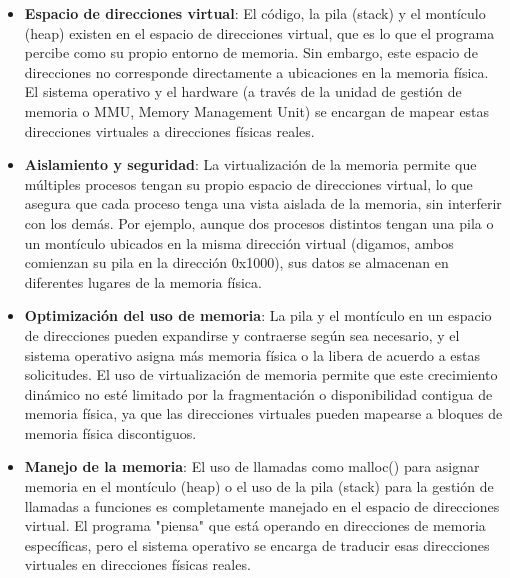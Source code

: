\documentclass{article}
\begin{document}
\begin{itemize}
    \item \textbf{Espacio de direcciones virtual}: El código, la pila (stack) y el montículo (heap) existen en el espacio de direcciones virtual, que es lo que el programa percibe como su propio entorno de memoria. Sin embargo, este espacio de direcciones no corresponde directamente a ubicaciones en la memoria física. El sistema operativo y el hardware (a través de la unidad de gestión de memoria o MMU, Memory Management Unit) se encargan de mapear estas direcciones virtuales a direcciones físicas reales.
    \item \textbf{Aislamiento y seguridad}: La virtualización de la memoria permite que múltiples procesos tengan su propio espacio de direcciones virtual, lo que asegura que cada proceso tenga una vista aislada de la memoria, sin interferir con los demás. Por ejemplo, aunque dos procesos distintos tengan una pila o un montículo ubicados en la misma dirección virtual (digamos, ambos comienzan su pila en la dirección 0x1000), sus datos se almacenan en diferentes lugares de la memoria física.
    \item \textbf{Optimización del uso de memoria}: La pila y el montículo en un espacio de direcciones pueden expandirse y contraerse según sea necesario, y el sistema operativo asigna más memoria física o la libera de acuerdo a estas solicitudes. El uso de virtualización de memoria permite que este crecimiento dinámico no esté limitado por la fragmentación o disponibilidad contigua de memoria física, ya que las direcciones virtuales pueden mapearse a bloques de memoria física discontiguos.
    \item \textbf{Manejo de la memoria}: El uso de llamadas como malloc() para asignar memoria en el montículo (heap) o el uso de la pila (stack) para la gestión de llamadas a funciones es completamente manejado en el espacio de direcciones virtual. El programa "piensa" que está operando en direcciones de memoria específicas, pero el sistema operativo se encarga de traducir esas direcciones virtuales en direcciones físicas reales.
\end{itemize}
\end{document}
